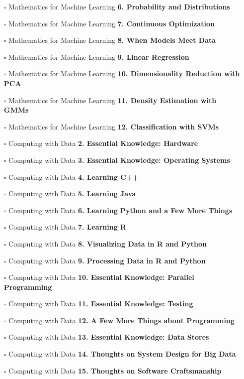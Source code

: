 \documentclass[a4, landscape, 12pt]{article}
\newcommand{\checkbox}{$\square$}%
\begin{document}
\begin{itemize}
{}
\item [\checkbox]  Mathematics for Machine Learning \textbf{ 6. Probability and Distributions
}
\item [\checkbox]  Mathematics for Machine Learning \textbf{ 7. Continuous Optimization
}
\item [\checkbox]  Mathematics for Machine Learning \textbf{ 8. When Models Meet Data
}
\item [\checkbox]  Mathematics for Machine Learning \textbf{ 9. Linear Regression
}
\item [\checkbox]  Mathematics for Machine Learning \textbf{ 10. Dimensionality Reduction with PCA
}
\item [\checkbox]  Mathematics for Machine Learning \textbf{ 11. Density Estimation with GMMs
}
\item [\checkbox]  Mathematics for Machine Learning \textbf{ 12. Classification with SVMs
}
\item [\checkbox]  Computing with Data \textbf{ 2. Essential Knowledge: Hardware
}
\item [\checkbox]  Computing with Data \textbf{ 3. Essential Knowledge: Operating Systems
}
\item [\checkbox]  Computing with Data \textbf{ 4. Learning C++
}
\item [\checkbox]  Computing with Data \textbf{ 5. Learning Java
}
\item [\checkbox]  Computing with Data \textbf{ 6. Learning Python and a Few More Things
}
\item [\checkbox]  Computing with Data \textbf{ 7. Learning R
}
\item [\checkbox]  Computing with Data \textbf{ 8. Visualizing Data in R and Python
}
\item [\checkbox]  Computing with Data \textbf{ 9. Processing Data in R and Python
}
\item [\checkbox]  Computing with Data \textbf{ 10. Essential Knowledge: Parallel Programming
}
\item [\checkbox]  Computing with Data \textbf{ 11. Essential Knowledge: Testing
}
\item [\checkbox]  Computing with Data \textbf{ 12. A Few More Things about Programming
}
\item [\checkbox]  Computing with Data \textbf{ 13. Essential Knowledge: Data Stores
}
\item [\checkbox]  Computing with Data \textbf{ 14. Thoughts on System Design for Big Data
}
\item [\checkbox]  Computing with Data \textbf{ 15. Thoughts on Software Craftsmanship
}
\end{itemize}
\end{document}
